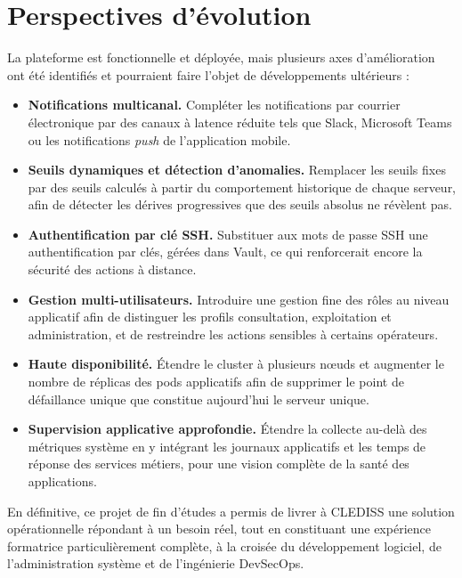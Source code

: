 \section*{Perspectives d'évolution}

La plateforme est fonctionnelle et déployée, mais plusieurs axes d'amélioration ont été
identifiés et pourraient faire l'objet de développements ultérieurs :

\begin{itemize}[label=]
  \item \textbf{Notifications multicanal.} Compléter les notifications par courrier
        électronique par des canaux à latence réduite tels que Slack, Microsoft Teams ou
        les notifications \textit{push} de l'application mobile.
  \item \textbf{Seuils dynamiques et détection d'anomalies.} Remplacer les seuils fixes
        par des seuils calculés à partir du comportement historique de chaque serveur,
        afin de détecter les dérives progressives que des seuils absolus ne révèlent pas.
  \item \textbf{Authentification par clé SSH.} Substituer aux mots de passe SSH une
        authentification par clés, gérées dans Vault, ce qui renforcerait encore la
        sécurité des actions à distance.
  \item \textbf{Gestion multi-utilisateurs.} Introduire une gestion fine des rôles au
        niveau applicatif afin de distinguer les profils consultation, exploitation et
        administration, et de restreindre les actions sensibles à certains opérateurs.
  \item \textbf{Haute disponibilité.} Étendre le cluster à plusieurs n\oe uds et
        augmenter le nombre de réplicas des pods applicatifs afin de supprimer le point
        de défaillance unique que constitue aujourd'hui le serveur unique.
  \item \textbf{Supervision applicative approfondie.} Étendre la collecte au-delà des
        métriques système en y intégrant les journaux applicatifs et les temps de réponse
        des services métiers, pour une vision complète de la santé des applications.
\end{itemize}

En définitive, ce projet de fin d'études a permis de livrer à CLEDISS une solution
opérationnelle répondant à un besoin réel, tout en constituant une expérience formatrice
particulièrement complète, à la croisée du développement logiciel, de l'administration
système et de l'ingénierie DevSecOps.
